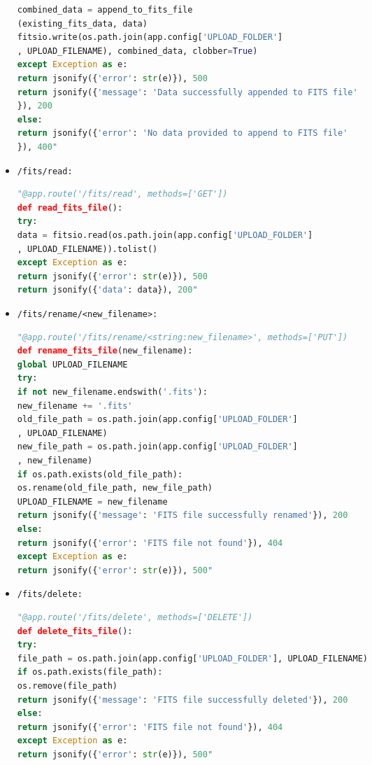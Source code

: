 \documentclass[a4paper,oneside,11pt]{book}
\begin{document}
\begin{itemize}
\begin{lstlisting}[language=Python, caption={Endpoint to append to a FITS file}]
combined_data = append_to_fits_file
(existing_fits_data, data)
fitsio.write(os.path.join(app.config['UPLOAD_FOLDER']
, UPLOAD_FILENAME), combined_data, clobber=True)
except Exception as e:
return jsonify({'error': str(e)}), 500
return jsonify({'message': 'Data successfully appended to FITS file'
}), 200
else:
return jsonify({'error': 'No data provided to append to FITS file'
}), 400"
    \end{lstlisting}
    \item \texttt{/fits/read:}
    \begin{lstlisting}[language=Python, caption={Endpoint to read a FITS file}]
"@app.route('/fits/read', methods=['GET'])
def read_fits_file():
try:
data = fitsio.read(os.path.join(app.config['UPLOAD_FOLDER']
, UPLOAD_FILENAME)).tolist()
except Exception as e:
return jsonify({'error': str(e)}), 500
return jsonify({'data': data}), 200"
    \end{lstlisting}
    \item \texttt{/fits/rename/<new\_filename>:}
    \begin{lstlisting}[language=Python, caption={Endpoint to rename a FITS file}]
"@app.route('/fits/rename/<string:new_filename>', methods=['PUT'])
def rename_fits_file(new_filename):
global UPLOAD_FILENAME
try:
if not new_filename.endswith('.fits'):
new_filename += '.fits'
old_file_path = os.path.join(app.config['UPLOAD_FOLDER']
, UPLOAD_FILENAME)
new_file_path = os.path.join(app.config['UPLOAD_FOLDER']
, new_filename)
if os.path.exists(old_file_path):
os.rename(old_file_path, new_file_path)
UPLOAD_FILENAME = new_filename
return jsonify({'message': 'FITS file successfully renamed'}), 200
else:
return jsonify({'error': 'FITS file not found'}), 404
except Exception as e:
return jsonify({'error': str(e)}), 500"
    \end{lstlisting}
    \item \texttt{/fits/delete:}
    \begin{lstlisting}[language=Python, caption={Endpoint to delete FITS file}]
"@app.route('/fits/delete', methods=['DELETE'])
def delete_fits_file():
try:
file_path = os.path.join(app.config['UPLOAD_FOLDER'], UPLOAD_FILENAME)
if os.path.exists(file_path):
os.remove(file_path)
return jsonify({'message': 'FITS file successfully deleted'}), 200
else:
return jsonify({'error': 'FITS file not found'}), 404
except Exception as e:
return jsonify({'error': str(e)}), 500"
    \end{lstlisting}
    \end{itemize}
\end{document}

